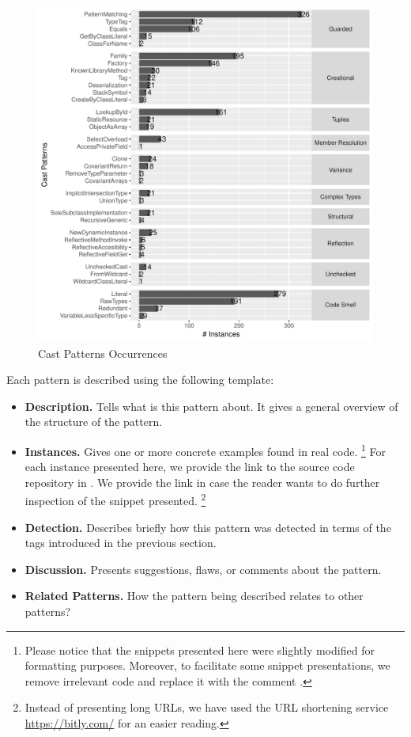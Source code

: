 \begin{figure}[ht!]
\centering
\includegraphics[width=\textwidth]{analysis/table-patterns-5000.pdf}
\caption{Cast Patterns Occurrences} \label{fig:patterns}
\end{figure}

Each pattern is described using the following template:

\begin{itemize}
\item \textbf{Description.}
Tells what is this pattern about.
It gives a general overview of the structure of the pattern.
\item \textbf{Instances.}
Gives one or more concrete examples found in real code.%
\footnote{Please notice that the snippets presented here were slightly
modified for formatting purposes.
Moreover, to facilitate some snippet presentations,
we remove irrelevant code and replace it with the
comment \code{// [...]}.}
For each instance presented here, we provide the link to the source code repository in \lgtm{}.
We provide the link in case the reader wants to do further inspection
of the snippet presented.%
\footnote{Instead of presenting \lgtm{} long URLs,
we have used the URL shortening service \url{https://bitly.com/}
for an easier reading.}
\item \textbf{Detection.}
Describes briefly how this pattern was detected in terms of the tags introduced in the previous section.
\item \textbf{Discussion.}
Presents suggestions, flaws, or comments about the pattern.
\item \textbf{Related Patterns.}
How the pattern being described relates to other patterns?
\end{itemize}

